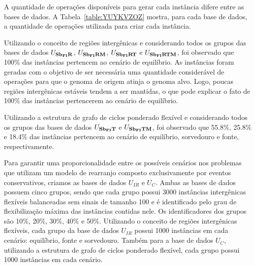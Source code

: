 A quantidade de operações disponíveis para gerar cada instância difere entre as bases de dados. A Tabela~\ref{table:YUYKVZOZ} mostra, para cada base de dados, a quantidade de operações utilizada para criar cada instância.



Utilizando o conceito de regiões intergênicas e considerando todos os grupos das bases de dados $U_{\textbf{Sb\textsubscript{FI}R}}{}$, $U_{\textbf{Sb\textsubscript{FI}RM}}{}$, $U_{\textbf{Sb\textsubscript{FI}RT}}{}$ e $U_{\textbf{Sb\textsubscript{FI}RTM}}{}$, foi observado que 100\% das instâncias pertencem ao cenário de equilíbrio. As instâncias foram geradas com o objetivo de ser necessária uma quantidade considerável de operações para que o genoma de origem atinja o genoma alvo. Logo, poucas regiões intergênicas estáveis tendem a ser mantidas, o que pode explicar o fato de 100\% das instâncias pertencerem ao cenário de equilíbrio.

Utilizando a estrutura de grafo de ciclos ponderado flexível e considerando todos os grupos das bases de dados $U_{\textbf{Sb\textsubscript{FI}T}}{}$ e $U_{\textbf{Sb\textsubscript{FI}TM}}{}$, foi observado que 55.8\%, 25.8\% e 18.4\% das instâncias pertencem ao cenário de equilíbrio, sorvedouro e fonte, respectivamente.

Para garantir uma proporcionalidade entre os possíveis cenários nos problemas que utilizam um modelo de rearranjo composto exclusivamente por eventos conservativos, criamos as bases de dados $U_{IR}$ e $U_{C}$. Ambas as bases de dados possuem cinco grupos, sendo que cada grupo possui 3000 instâncias intergênicas flexíveis balanceadas sem sinais de tamanho 100 e é identificado pelo grau de flexibilização máxima das instâncias contidas nele. Os identificadores dos grupos são 10\%, 20\%, 30\%, 40\% e 50\%. Utilizando o conceito de regiões intergênicas flexíveis, cada grupo da base de dados $U_{IR}$ possui 1000 instâncias em cada cenário: equilíbrio, fonte e sorvedouro. Também para a base de dados $U_{C}$, utilizando a estrutura de grafo de ciclos ponderado flexível, cada grupo possui 1000 instâncias em cada cenário.

